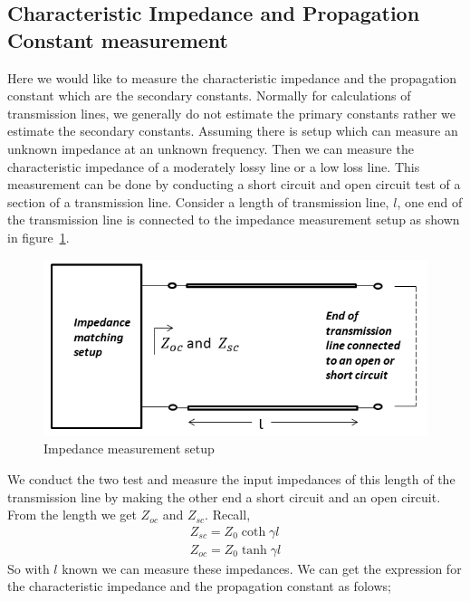 \subsection{Characteristic Impedance and Propagation Constant measurement}
Here we would like to measure the characteristic impedance and the propagation constant which are the secondary constants. Normally for calculations of transmission lines, we generally do not estimate the primary constants rather we estimate the secondary constants. Assuming there is setup which can measure an unknown impedance at an unknown frequency. Then we can measure the characteristic impedance of a moderately lossy line or a low loss line. This measurement can be done by conducting a short circuit and open circuit test of a section of a transmission line. Consider a length of transmission line, $l$, one end of the transmission line is connected to the impedance measurement setup as shown in figure~\ref{fig:impmeasurement}.
\begin{figure}[h]
\centering
\includegraphics[width=1\linewidth]{"./graphics/impedance_measurement"}
\caption{Impedance measurement setup}
\label{fig:impmeasurement}
\end{figure}

We conduct the two test and measure the input impedances of this length of the transmission line by making the other end a short circuit and an open circuit. From the length we get $Z_{oc}$ and $Z_{sc}$. Recall,
\begin{align}
Z_{sc} = Z_0 \coth\gamma l\label{eqn:zsclossy}\\
Z_{oc} = Z_0 \tanh\gamma l\label{eqn:zoclossy}
\end{align}
So with $l$ known we can measure these impedances. We can get the expression for the characteristic impedance and the propagation constant as folows;

